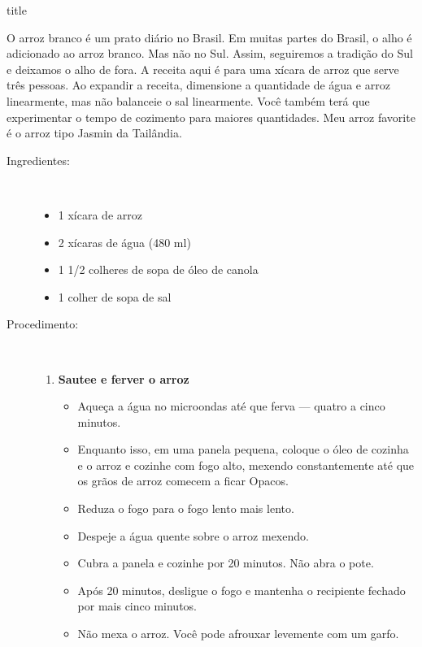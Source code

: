 \documentclass [11pt, letterpaper] {article}
\begin{document}
 {title}

O arroz branco é um prato diário no Brasil. Em muitas partes do Brasil, o alho é adicionado ao arroz branco. Mas não no Sul. Assim, seguiremos a tradição do Sul e deixamos o alho de fora. A receita aqui é para uma xícara de arroz que serve três pessoas. Ao expandir a receita, dimensione a quantidade de água e arroz linearmente, mas não balanceie o sal linearmente. Você também terá que experimentar o tempo de cozimento para maiores quantidades. Meu arroz favorite \'e o arroz tipo Jasmin da Tail\^andia.

\vspace {0.3in}

\begin {description}

\item [Ingredientes:] \ \\
\begin {itemize}
\item 1 xícara de arroz
\item 2 xícaras de água (480 ml)
\item 1 1/2 colheres de sopa de óleo de canola
\item 1 colher de sopa de sal
\end {itemize}

\item [Procedimento:] \ \\

\begin {enumerate}
\item {\bf Sautee e ferver o arroz}
\begin {itemize}
\item Aqueça a água no microondas até que ferva --- quatro a cinco minutos.
\item Enquanto isso, em uma panela pequena, coloque o óleo de cozinha e o arroz e cozinhe com fogo alto, mexendo constantemente até que os grãos de arroz comecem a ficar Opacos.
\item Reduza o fogo para o fogo lento mais lento.
\item Despeje a água quente sobre o arroz mexendo.
\item Cubra a panela e cozinhe por 20 minutos. Não abra o pote.
\item Após 20 minutos, desligue o fogo e mantenha o recipiente fechado por mais cinco minutos.
\item Não mexa o arroz. Você pode afrouxar levemente com um garfo.
\end {itemize}

\end {enumerate}
\end {description}
\end{document}
